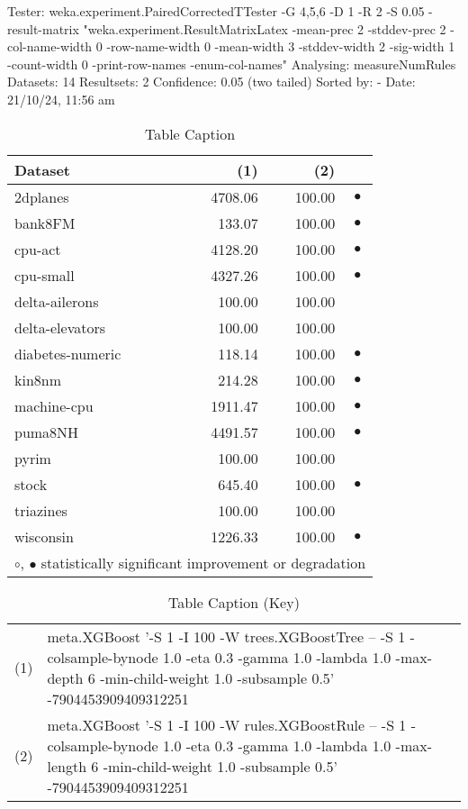 Tester:     weka.experiment.PairedCorrectedTTester -G 4,5,6 -D 1 -R 2 -S 0.05 -result-matrix "weka.experiment.ResultMatrixLatex -mean-prec 2 -stddev-prec 2 -col-name-width 0 -row-name-width 0 -mean-width 3 -stddev-width 2 -sig-width 1 -count-width 0 -print-row-names -enum-col-names"
Analysing:  measureNumRules
Datasets:   14
Resultsets: 2
Confidence: 0.05 (two tailed)
Sorted by:  -
Date:       21/10/24, 11:56 am


\begin{table}[thb]
\caption{\label{labelname}Table Caption}
\footnotesize
{\centering \begin{tabular}{lrr@{\hspace{0.1cm}}c}
\\
\hline
Dataset & (1)& (2) & \\
\hline
2dplanes & 4708.06 & 100.00 & $\bullet$\\
bank8FM &  133.07 & 100.00 & $\bullet$\\
cpu-act & 4128.20 & 100.00 & $\bullet$\\
cpu-small & 4327.26 & 100.00 & $\bullet$\\
delta-ailerons &  100.00 & 100.00 &          \\
delta-elevators &  100.00 & 100.00 &          \\
diabetes-numeric &  118.14 & 100.00 & $\bullet$\\
kin8nm &  214.28 & 100.00 & $\bullet$\\
machine-cpu & 1911.47 & 100.00 & $\bullet$\\
puma8NH & 4491.57 & 100.00 & $\bullet$\\
pyrim &  100.00 & 100.00 &          \\
stock &  645.40 & 100.00 & $\bullet$\\
triazines &  100.00 & 100.00 &          \\
wisconsin & 1226.33 & 100.00 & $\bullet$\\
\hline
\multicolumn{4}{c}{$\circ$, $\bullet$ statistically significant improvement or degradation}\\
\end{tabular} \footnotesize \par}
\end{table}


\begin{table}[thb]
\caption{\label{labelname}Table Caption (Key)}
\scriptsize
{\centering
\begin{tabular}{cl}\\
(1) & meta.XGBoost '-S 1 -I 100 -W trees.XGBoostTree -- -S 1 -colsample-bynode 1.0 -eta 0.3 -gamma 1.0 -lambda 1.0 -max-depth 6 -min-child-weight 1.0 -subsample 0.5' -7904453909409312251 \\
(2) & meta.XGBoost '-S 1 -I 100 -W rules.XGBoostRule -- -S 1 -colsample-bynode 1.0 -eta 0.3 -gamma 1.0 -lambda 1.0 -max-length 6 -min-child-weight 1.0 -subsample 0.5' -7904453909409312251 \\
\end{tabular}
}
\end{table}

